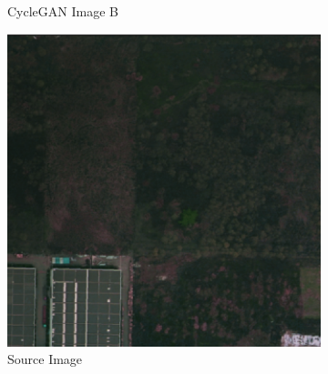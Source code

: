 \documentclass[10pt,twocolumn,letterpaper]{article}
\begin{document}
{\begin{figure}[t]
\begin{minipage}{0.48\textwidth}
\begin{subfigure}[b]{0.4\textwidth}
                \caption{CycleGAN Image B}
                \label{fig:image1508_fake}
            \end{subfigure}
            \caption{Comparison between original images and CycleGAN-generated images}
            \label{fig:CycleGAN}  
        \end{minipage}
        \hfill
        \begin{minipage}{0.48\textwidth} 
            \centering
            \captionsetup{font=small}
            \begin{subfigure}[b]{0.4\textwidth}
                \includegraphics[width=\textwidth]{images/dacs_source_im.png}
                \caption{Source Image}
            \end{subfigure}
            \hspace{2mm}
            \begin{subfigure}[b]{0.4\textwidth}

\end{subfigure}
\end{minipage}
\end{figure}}
\end{document}
